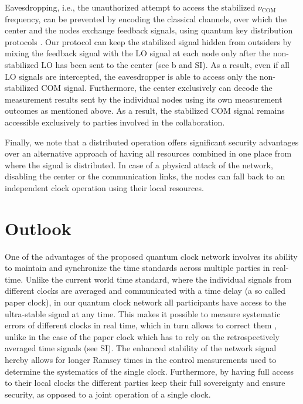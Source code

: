 Eavesdropping, i.e., the unauthorized attempt to access the stabilized
$\nu_\mathrm{COM}$ frequency, can be prevented by encoding the classical channels,
over which the center and the nodes exchange feedback signals, using quantum key
distribution protocols \cite{Gisin2002}. Our protocol can keep the stabilized
signal hidden from outsiders by mixing the feedback signal with the LO signal at each node only
after the non-stabilized LO has been sent to the center (see
b and SI). As a result, even if  all LO signals are intercepted, the eavesdropper is able to access
only the non-stabilized COM signal. Furthermore, the center exclusively can decode the
measurement results sent by the individual nodes using its own measurement outcomes as mentioned above. 
As a result, the stabilized COM signal remains
accessible exclusively to parties involved in the collaboration.

Finally, we note that a distributed operation offers significant security
advantages over an alternative approach of having all resources combined in one
place from where the signal is distributed. In case of a physical attack of the
network, disabling the center or the communication links, the nodes can fall
back to an independent clock operation using their local resources.

\section{Outlook}

One of the advantages of the proposed quantum clock network involves its ability
to maintain and synchronize the time standards across multiple parties in
real-time. 
Unlike the current world time standard, where the individual signals from
different clocks are averaged and communicated with a time delay (a so called
paper clock), in our quantum clock network all participants have access to the
ultra-stable signal at any time.
This makes it possible to measure systematic errors of different clocks in
real time, which in turn allows to correct them \cite{Bloom2014}, unlike in the
case of the paper clock which has to rely on the retrospectively averaged time 
signals (see SI). 
The enhanced stability of the network signal hereby allows for longer Ramsey
times in the control measurements used to determine the systematics of the
single clock.
Furthermore, by having full access to their local clocks the different parties
keep  their full sovereignty and ensure security, as opposed to a joint
operation of a single clock.

